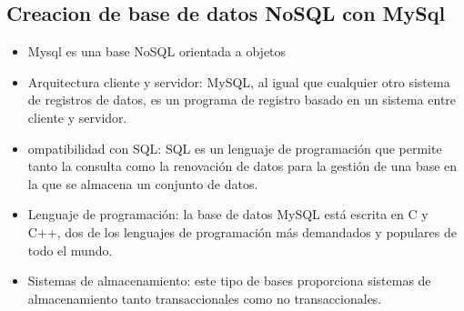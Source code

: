 \documentclass[%
 reprint,
 amsmath,amssymb,
 aps,
]{revtex4-1}
\begin{document}
\subsection{Creacion de base de datos NoSQL con MySql}
                     \begin{itemize}
		\item Mysql es una base NoSQL orientada a objetos
		\item Arquitectura cliente y servidor: MySQL, al igual que cualquier otro sistema de registros de datos, es un programa de registro basado en un sistema entre cliente y servidor.
		\item ompatibilidad con SQL: SQL es un lenguaje de programación que permite tanto la consulta como la renovación de datos para la gestión de una base en la que se almacena un conjunto de datos.
                     \item Lenguaje de programación: la base de datos MySQL está escrita en C y C++, dos de los lenguajes de programación más demandados y populares de todo el mundo.
                     \item Sistemas de almacenamiento: este tipo de bases proporciona sistemas de almacenamiento tanto transaccionales como no transaccionales.
                     \end{itemize}
\end{document}
